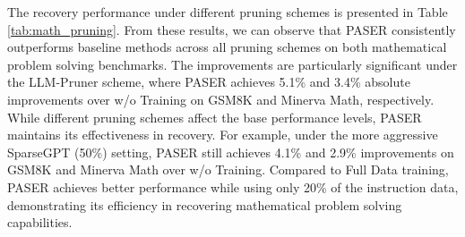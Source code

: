 \begin{table*}[h]
\caption{Recovery performance of different instruction tuning data selection methods on mathematical problem solving tasks under various pruning schemes. The 'bold' represents the best performance under the same pruning scheme.}
\label{tab:math_pruning}
\centering
{}
\end{table*}

The recovery performance under different pruning schemes is presented in Table \ref{tab:math_pruning}. From these results, we can observe that PASER consistently outperforms baseline methods across all pruning schemes on both mathematical problem solving benchmarks. The improvements are particularly significant under the LLM-Pruner scheme, where PASER achieves 5.1\% and 3.4\% absolute improvements over w/o Training on GSM8K and Minerva Math, respectively. While different pruning schemes affect the base performance levels, PASER maintains its effectiveness in recovery. For example, under the more aggressive SparseGPT (50\%) setting, PASER still achieves 4.1\% and 2.9\% improvements on GSM8K and Minerva Math over w/o Training. Compared to Full Data training, PASER achieves better performance while using only 20\% of the instruction data, demonstrating its efficiency in recovering mathematical problem solving capabilities.

